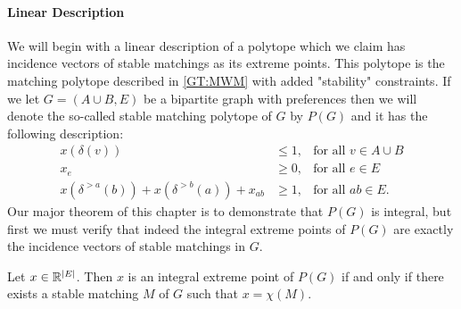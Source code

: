 \paragraph{Linear Description}
We will begin with a linear description of a polytope which we claim has incidence vectors of stable matchings as its extreme points. This polytope is the matching polytope described in \ref{GT:MWM} with added "stability" constraints. If we let $G=(A\cup B, E)$ be a bipartite graph with preferences then we will denote the so-called stable matching polytope of $G$ by $P(G)$ and it has the following description:
\begin{align}
x(\delta(v)) &\leq 1, &\text{for all } v \in A\cup B \label{constraint:one}\\
x_e &\geq 0, &\text{for all } e \in E \label{constraint:nonneg}\\
x(\delta^{>a}(b)) + x(\delta^{>b}(a)) + x_{ab} &\geq 1, &\text{for all } ab \in E.\label{constraint:stab}
\end{align}
Our major theorem of this chapter is to demonstrate that $P(G)$ is integral, but first we must verify that indeed the integral extreme points of $P(G)$ are exactly the incidence vectors of stable matchings in $G$.
\begin{lemma}\label{lemma:int-P}
Let $x \in \mathbb{R}^{\left|E\right|}$. Then $x$ is an integral extreme point of $P(G)$ if and only if there exists a stable matching $M$ of $G$ such that $x = \chi(M)$.
\end{lemma}
